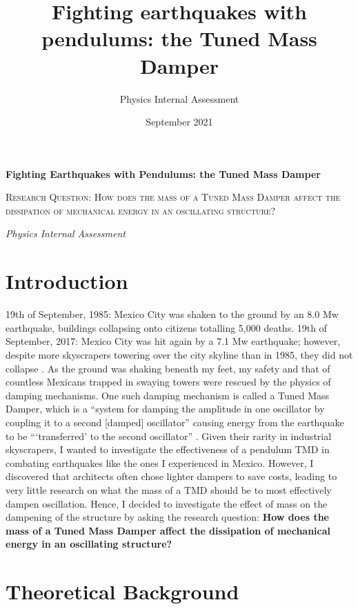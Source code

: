 \documentclass[11pt]{article}
\title{Fighting earthquakes with pendulums: the Tuned Mass Damper}
\author{Physics Internal Assessment
}
\date{September 2021}
\begin{document}
\begin{titlepage}
	\centering
	{\huge\bfseries Fighting Earthquakes with Pendulums: the Tuned Mass Damper \par}
	\vspace{2cm}
	{\scshape\Large Research Question: How does the mass of a Tuned Mass Damper affect the dissipation of mechanical energy in an oscillating structure? \par}
	\vspace{1.5cm}
	{\Large\itshape Physics Internal Assessment \par}

	\vfill

\end{titlepage}


\clearpage
\section{Introduction}

19th of September, 1985: Mexico City was shaken to the ground by an 8.0 Mw earthquake, buildings collapsing onto citizens totalling 5,000 deaths. 19th of September, 2017: Mexico City was hit again by a 7.1 Mw earthquake; however, despite more skyscrapers towering over the city skyline than in 1985, they did not collapse \autocite{vance}. As the ground was shaking beneath my feet, my safety and that of countless Mexicans trapped in swaying towers were rescued by the physics of damping mechanisms. One such damping mechanism is called a Tuned Mass Damper, which is a “system for damping the amplitude in one oscillator by coupling it to a second [damped] oscillator” causing energy from the earthquake to be “‘transferred’ to the second oscillator” \autocite{orloff}. Given their rarity in industrial skyscrapers, I wanted to investigate the effectiveness of a pendulum TMD in combating earthquakes like the ones I experienced in Mexico. However, I discovered that architects often chose lighter dampers to save costs, leading to very little research on what the mass of a TMD should be to most effectively dampen oscillation. Hence, I decided to investigate the effect of mass on the dampening of the structure by asking the research question: \textbf{How does the mass of a Tuned Mass Damper affect the dissipation of mechanical energy in an oscillating structure?}

\section{Theoretical Background}
\end{document}

